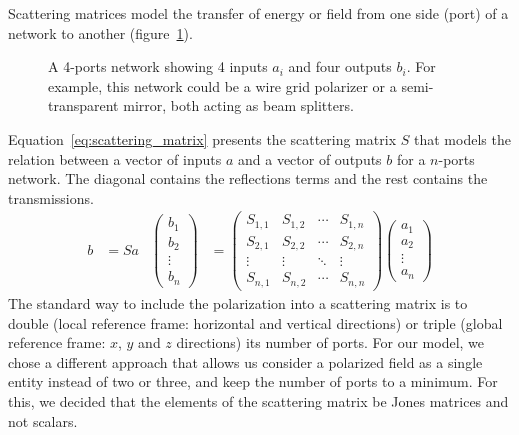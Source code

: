 \documentclass[a4paper,11pt]{article}
\begin{document}
Scattering matrices \cite{siegman1986lasers} model the transfer of energy or field from one side (port) of a network to another (figure~\ref{fig:ports}).
\begin{figure}[hbtp]
    \centering
    
    \caption{\label{fig:ports}A 4-ports network showing 4 inputs $a_i$ and four outputs $b_i$.  For example, this network could be a wire grid polarizer or a semi-transparent mirror, both acting as beam splitters.}
\end{figure}
Equation~\ref{eq:scattering_matrix} presents the scattering matrix $S$ that models the relation between a vector of inputs $a$ and a vector of outputs $b$ for a $n$-ports network.
The diagonal contains the reflections terms and the rest contains the transmissions.
\begin{align}
    b &= S a
    &
    \begin{pmatrix}
        b_1\\
        b_2\\
        \vdots\\
        b_n
    \end{pmatrix}
    &=
    \begin{pmatrix}
        S_{1, 1} & S_{1, 2} & \cdots & S_{1, n} \\
        S_{2, 1} & S_{2, 2} & \cdots & S_{2, n} \\
        \vdots   & \vdots   & \ddots & \vdots   \\
        S_{n, 1} & S_{n, 2} & \cdots & S_{n, n}
    \end{pmatrix}
    \begin{pmatrix}
        a_1\\
        a_2\\
        \vdots\\
        a_n
    \end{pmatrix}
    \label{eq:scattering_matrix}
\end{align}
The standard way to include the polarization into a scattering matrix is to double (local reference frame: horizontal and vertical directions) or triple (global reference frame: $x$, $y$ and $z$ directions) its number of ports.
For our model, we chose a different approach that allows us consider a polarized field as a single entity instead of two or three, and keep the number of ports to a minimum.
For this, we decided that the elements of the scattering matrix be Jones matrices and not scalars.
\end{document}
